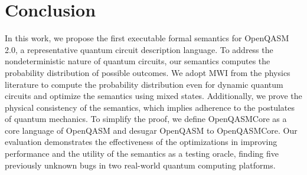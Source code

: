 \chapter{Conclusion}
\label{ch:conclusion}

\noindent
In this work, we propose the first executable formal semantics for OpenQASM
2.0, a representative quantum circuit description language.
%
To address the nondeterministic nature of quantum circuits, our semantics
computes the probability distribution of possible outcomes.
%
We adopt MWI from the physics literature to compute the probability
distribution even for dynamic quantum circuits and optimize the semantics using
mixed states.
%
Additionally, we prove the physical consistency of the semantics, which implies
adherence to the postulates of quantum mechanics.
%
To simplify the proof, we define OpenQASMCore as a core language of OpenQASM
and desugar OpenQASM to OpenQASMCore.
%
Our evaluation demonstrates the effectiveness of the optimizations in improving
performance and the utility of the semantics as a testing oracle, finding five
previously unknown bugs in two real-world quantum computing platforms.

